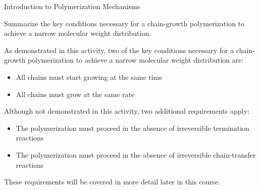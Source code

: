 \begin{activity}{Introduction to Polymerization Mechanisms}
\begin{exercises}
		\exercise Summarize the key conditions necessary for a chain-growth polymerization to achieve a narrow molecular weight distribution.
		
			\begin{solution}{}
				As demonstrated in this activity, two of the key conditions necessary for a chain-growth polymerization to achieve a narrow molecular weight distribution are:
				\begin{itemize}
					\item All chains must start growing at the same time
					\item All chains must grow at the same rate
				\end{itemize}
				
				Although not demonstrated in this activity, two additional requirements apply:
				\begin{itemize}
					\item The polymerization must proceed in the absence of irreversible termination reactions
					\item The polymerization must proceed in the absence of irreversible chain-transfer reactions
				\end{itemize}
				These requirements will be covered in more detail later in this course.
			\end{solution}
			
\end{exercises}
	
\end{activity}